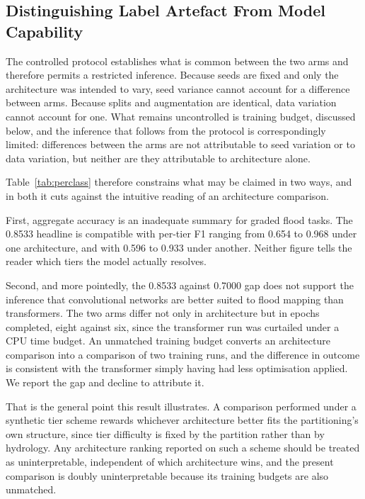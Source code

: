 \subsection{Distinguishing Label Artefact From Model Capability}
\label{sec:distinguish}

The controlled protocol establishes what is common between the two arms and
therefore permits a restricted inference. Because seeds are fixed and only the
architecture was intended to vary, seed variance cannot account for a
difference between arms. Because splits and augmentation are identical, data
variation cannot account for one. What remains uncontrolled is training budget,
discussed below, and the inference that follows from the protocol is
correspondingly limited: differences between the arms are not attributable to
seed variation or to data variation, but neither are they attributable to
architecture alone.

Table~\ref{tab:perclass} therefore constrains what may be claimed in two ways,
and in both it cuts against the intuitive reading of an architecture comparison.

First, aggregate accuracy is an inadequate summary for graded flood tasks. The
0.8533 headline is compatible with per-tier F1 ranging from 0.654 to 0.968 under
one architecture, and with 0.596 to 0.933 under another. Neither figure tells
the reader which tiers the model actually resolves.

Second, and more pointedly, the 0.8533 against 0.7000 gap does not support the
inference that convolutional networks are better suited to flood mapping than
transformers. The two arms differ not only in architecture but in epochs
completed, eight against six, since the transformer run was curtailed under a
CPU time budget. An unmatched training budget converts an architecture
comparison into a comparison of two training runs, and the difference in
outcome is consistent with the transformer simply having had less optimisation
applied. We report the gap and decline to attribute it.

That is the general point this result illustrates. A comparison performed under
a synthetic tier scheme rewards whichever architecture better fits the
partitioning's own structure, since tier difficulty is fixed by the partition
rather than by hydrology. Any architecture ranking reported on such a scheme
should be treated as uninterpretable, independent of which architecture wins,
and the present comparison is doubly uninterpretable because its training
budgets are also unmatched.

